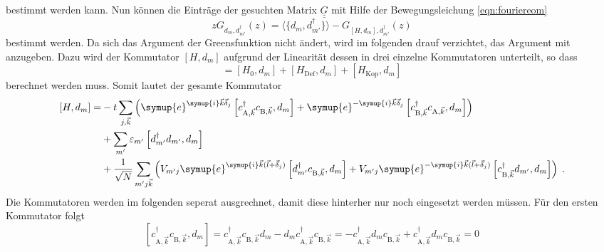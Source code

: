 bestimmt werden kann.
Nun können die Einträge der gesuchten Matrix $\underline{\underline{G}}$ mit Hilfe der Bewegungsleichung \eqref{eqn:fouriereom} 
\begin{equation}
    zG_{d_m, d_{m'}^\dagger}(z) = \langle \{ d_m, d_{m'}^\dagger \} \rangle - G_{[H,d_m], d_{m'}^\dagger} (z) \label{eqn:eomgreenansatz}
\end{equation}
bestimmt werden.
Da sich das Argument der Greensfunktion nicht ändert, wird im folgenden drauf verzichtet, das Argument mit anzugeben.
Dazu wird der Kommutator $[H,d_m]$ aufgrund der Linearität dessen in drei einzelne Kommutatoren unterteilt, so dass
\begin{equation*}
    [H,d_m] = [H_0,d_m] + [H_\text{Def},d_m] +[H_\text{Kop},d_m] 
\end{equation*}
berechnet werden muss.
Somit lautet der gesamte Kommutator
\begin{equation}
    \begin{split}
    [H, d_m] = &-t \sum_{j,\vec{k}} \left ( \symup{e}^{\symup{i}\vec{k} \vec{\delta}_j}      \left [ c^\dagger_{\text{A},\vec{k}}  
        c_{\text{B},\vec{k}}, d_m \right ] + \symup{e}^{-\symup{i}\vec{k} \vec{\delta}_j}   \left [ c^\dagger_{\text{B},\vec{k}}  
        c_{\text{A},\vec{k}}, d_m \right ]  \right ) \\
        &+\sum_{m'} \varepsilon_{m'} \left [ d^\dagger_{m'} d_{m'}, d_{m} \right ] \\
        &+ \frac{1}{\sqrt{N}} \sum_{m'j\vec{k}} \left ( V_{m'j} \symup{e}^{\symup{i}\vec{k} (\vec{l} + \vec{\delta}_j)}   
        \left [d^\dagger_{m'}c_{\text{B}, \vec{k}}, d_m \right ]
        +  V_{m'j} \symup{e}^{-\symup{i}\vec{k} (\vec{l} + \vec{\delta}_j)}   
        \left [c^\dagger_{\text{B},\vec{k}} d_{m'},  d_m \right ]
        \right ) \; . \label{eqn:commutator_H_dm}
    \end{split}
\end{equation} 
Die Kommutatoren werden im folgenden seperat ausgrechnet, damit diese hinterher nur noch eingesetzt werden müssen.
Für den ersten Kommutator folgt
\begin{equation}
    \left [ c^\dagger_{\text{A},\vec{k}}  c_{\text{B},\vec{k}}, d_m \right ]  = c^\dagger_{\text{A},\vec{k}}  c_{\text{B},\vec{k}}  d_m 
        -  d_m c^\dagger_{\text{A},\vec{k}}  c_{\text{B},\vec{k}}
        = - c^\dagger_{\text{A},\vec{k}} d_m c_{\text{B},\vec{k}} + c^\dagger_{\text{A},\vec{k}} d_m c_{\text{B},\vec{k}} = 0 \label{eqn:kommutatornull}
\end{equation}
